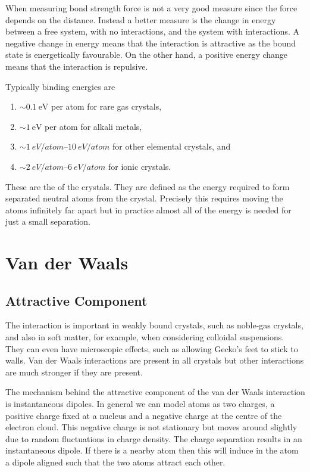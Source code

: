 \documentclass[fleqn]{NotesClass}
\begin{document}
    When measuring bond strength force is not a very good measure since the force depends on the distance.
    Instead a better measure is the change in energy between a free system, with no interactions, and the system with interactions.
    A negative change in energy means that the interaction is attractive as the bound state is energetically favourable.
    On the other hand, a positive energy change means that the interaction is repulsive.
    
    Typically binding energies are
    \begin{enumerate}
        \item \(\sim\qty{0.1}{\electronvolt}\) per atom for rare gas crystals,
        \item \(\sim\qty{1}{\electronvolt} \) per atom for alkali metals,
        \item \(\sim\qtyrange{1}{10}{eV/atom}\) for other elemental crystals, and
        \item \(\sim\qtyrange{2}{6}{eV/atom}\) for ionic crystals.
    \end{enumerate}
    These are the  of the crystals.
    They are defined as the energy required to form separated neutral atoms from the crystal.
    Precisely this requires moving the atoms infinitely far apart but in practice almost all of the energy is needed for just a small separation.
    
    \section{Van der Waals}
    \subsection{Attractive Component}
    The  interaction is important in weakly bound crystals, such as noble-gas crystals, and also in soft matter, for example, when considering colloidal suspensions.
    They can even have microscopic effects, such as allowing Gecko's feet to stick to walls.
    Van der Waals interactions are present in all crystals but other interactions are much stronger if they are present.
    
    The mechanism behind the attractive component of the van der Waals interaction is instantaneous dipoles.
    In general we can model atoms as two charges, a positive charge fixed at a nucleus and a negative charge at the centre of the electron cloud.
    This negative charge is not stationary but moves around slightly due to random fluctuations in charge density.
    The charge separation results in an instantaneous dipole.
    If there is a nearby atom then this will induce in the atom a dipole aligned such that the two atoms attract each other.
    
\end{document}
